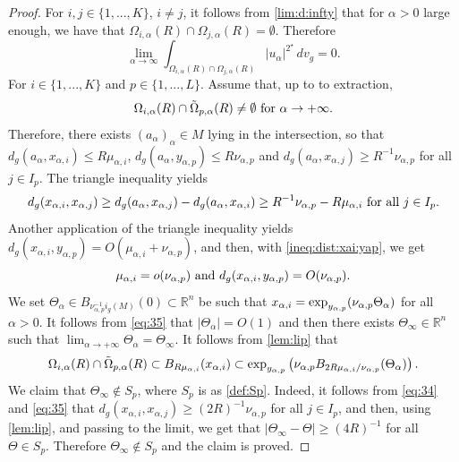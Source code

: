 \documentclass[reqno]{amsart}
\def \rn {\mathbb{R}^n}
\def \crit {2^\star}
\def \ua {u_\alpha}
\def \xai {x_{\alpha,i}}
\def \mai {\mu_{\alpha,i}}
\def \xaj {x_{\alpha,j}}
\def \nap {\nu_{\alpha,p}}
\def \yap {y_{\alpha,p}}
\begin{document}
\begin{proof}
\smallskip\noindent  For $i,j\in \{1,...,K\}$, $i\neq j$, it follows from \eqref{lim:d:infty} that for $\alpha>0$ large enough, we have that $\Omega_{i,\alpha}(R)\cap \Omega_{j,\alpha}(R)=\emptyset$. Therefore
\begin{equation}\label{lim:int:1}
\lim_{\alpha\to \infty}\int_{\Omega_{i,\alpha}(R)\cap \Omega_{j,\alpha}(R)}|\ua|^{\crit}\, dv_g=0.
\end{equation}
\smallskip\noindent For $i\in \{1,...,K\}$ and $p\in\{1,...,L\}$. Assume that, up to to extraction,
$$\Omega_{i,\alpha}(R)\cap \tilde{\Omega}_{p,\alpha}(R)\neq \emptyset\hbox{ for }\alpha\to +\infty.$$
Therefore, there exists $(a_\alpha)_\alpha\in M$ lying in the intersection, so that $d_g(a_\alpha, \xai)\leq R\mai$, $d_g(a_\alpha, \yap)\leq R\nap$ and $d_g(a_\alpha, \xaj)\geq R^{-1}\nap$ for all $j\in I_p$. The triangle inequality yields
\begin{equation}\label{eq:34}
d_g(\xai,\xaj)\geq d_g(a_\alpha,\xaj)-d_g(a_\alpha,\xai)\geq R^{-1}\nap-R\mai\hbox{ for all }j\in I_p.
\end{equation}
Another application of the triangle inequality yields $d_g(\xai,\yap)=O(\mai+\nap)$, and then, with  \eqref{ineq:dist:xai:yap}, we get 
\begin{equation}\label{eq:35}
\mai=o(\nap)\hbox{ and }d_g(\xai,\yap)=O(\nap).
\end{equation}
We set $\Theta_\alpha\in B_{\nap^{-1}i_g(M)}(0)\subset\rn$ be such that $\xai=\hbox{exp}_{\yap}(\nap \Theta_\alpha)$ for all $\alpha>0$. It follows from \eqref{eq:35} that $|\Theta_\alpha|=O(1)$ and then there exists $\Theta_\infty\in\rn$ such that $\lim_{\alpha\to +\infty}\Theta_\alpha=\Theta_\infty$. It follows from \eqref{lem:lip} that
$$\Omega_{i,\alpha}(R)\cap \tilde{\Omega}_{p,\alpha}(R)\subset B_{R\mai}(\xai)\subset \hbox{exp}_{\yap}\left(\nap B_{2R\mai/\nap}(\Theta_\alpha)\right).$$
We claim that $\Theta_\infty\not\in S_p$, where $S_p$ is as \eqref{def:Sp}. Indeed, it follows from  \eqref{eq:34} and \eqref{eq:35} that $d_g(\xai,\xaj)\geq (2R)^{-1}\nap$ for all $j\in I_p$, and then, using \eqref{lem:lip},  and passing to the limit, we get that $|\Theta_\infty-\Theta|\geq (4R)^{-1}$ for all $\Theta\in S_p$. Therefore $\Theta_\infty\not\in S_p$ and the claim is proved.


\end{proof}
\end{document}
